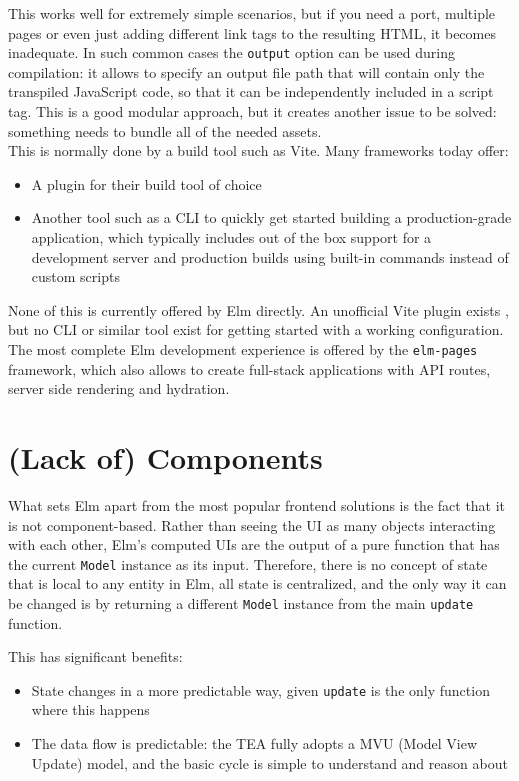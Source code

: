 This works well for extremely simple scenarios, but if you need a port, multiple pages or even just adding different link tags to the resulting HTML, it becomes inadequate. In such common cases the \texttt{output} option can be used during compilation: it allows to specify an output file path that will contain only the transpiled JavaScript code, so that it can be independently included in a script tag. This is a good modular approach, but it creates another issue to be solved: something needs to bundle all of the needed assets.\\

This is normally done by a build tool such as Vite. Many frameworks today offer:
\begin{itemize}
    \item A plugin for their build tool of choice
    \item Another tool such as a CLI to quickly get started building a production-grade application, which typically includes out of the box support for a development server and production builds using built-in commands instead of custom scripts
\end{itemize}
None of this is currently offered by Elm directly. An unofficial Vite plugin exists \cite{hamasaki_hmskvite-plugin-elm_2024}, but no CLI or similar tool exist for getting started with a working configuration.\\

The most complete Elm development experience is offered by the \texttt{elm-pages} framework, which also allows to create full-stack applications with API routes, server side rendering and hydration. \cite{noauthor_what_nodate}

\section{(Lack of) Components}
What sets Elm apart from the most popular frontend solutions is the fact that it is not component-based. Rather than seeing the UI as many objects interacting with each other, Elm's computed UIs are the output of a pure function that has the current \texttt{Model} instance as its input. Therefore, there is no concept of state that is local to any entity in Elm, all state is centralized, and the only way it can be changed is by returning a different \texttt{Model} instance from the main \texttt{update} function.

This has significant benefits:
\begin{itemize}
    \item State changes in a more predictable way, given \texttt{update} is the only function where this happens
    \item The data flow is predictable: the TEA fully adopts a MVU (Model View Update) model, and the basic cycle is simple to understand and reason about
\end{itemize}

